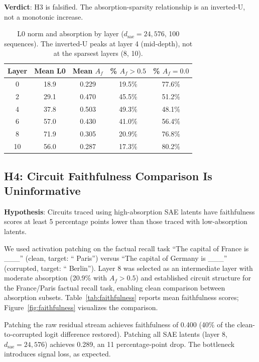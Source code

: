 \documentclass{article}
\begin{document}
\textbf{Verdict}: H3 is falsified. The absorption-sparsity relationship is an inverted-U, not a monotonic increase.

\begin{table}[t]
\caption{L0 norm and absorption by layer ($d_{\text{sae}} = 24{,}576$, 100 sequences). The inverted-U peaks at layer 4 (mid-depth), not at the sparsest layers (8, 10).}
\label{tab:layer_stats}
\centering
\begin{tabular}{ccccc}
\toprule
Layer & Mean L0 & Mean $A_f$ & \% $A_f > 0.5$ & \% $A_f = 0.0$ \\
\midrule
0 & 18.9 & 0.229 & 19.5\% & 77.6\% \\
2 & 29.1 & 0.470 & 45.5\% & 51.2\% \\
4 & 37.8 & 0.503 & 49.3\% & 48.1\% \\
6 & 57.0 & 0.430 & 41.0\% & 56.4\% \\
8 & 71.9 & 0.305 & 20.9\% & 76.8\% \\
10 & 56.0 & 0.287 & 17.3\% & 80.2\% \\
\bottomrule
\end{tabular}
\end{table}

\subsection{H4: Circuit Faithfulness Comparison Is Uninformative}
\label{sec:h4}

\textbf{Hypothesis}: Circuits traced using high-absorption SAE latents have faithfulness scores at least 5 percentage points lower than those traced with low-absorption latents.

We used activation patching on the factual recall task ``The capital of France is \_\_\_'' (clean, target: `` Paris'') versus ``The capital of Germany is \_\_\_'' (corrupted, target: `` Berlin''). Layer 8 was selected as an intermediate layer with moderate absorption (20.9\% with $A_f > 0.5$) and established circuit structure for the France/Paris factual recall task, enabling clean comparison between absorption subsets. Table~\ref{tab:faithfulness} reports mean faithfulness scores; Figure~\ref{fig:faithfulness} visualizes the comparison.

Patching the raw residual stream achieves faithfulness of 0.400 (40\% of the clean-to-corrupted logit difference restored). Patching all SAE latents (layer 8, $d_{\text{sae}} = 24{,}576$) achieves 0.289, an 11 percentage-point drop. The bottleneck introduces signal loss, as expected.
\end{document}

